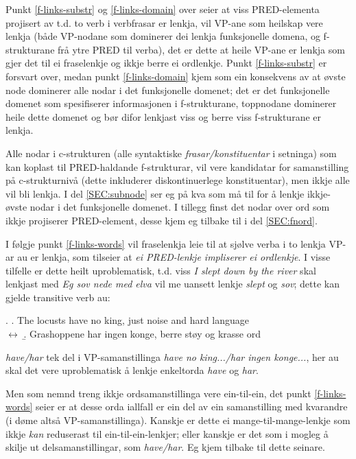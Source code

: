 \documentclass[11pt,a4paper,oneside,draft]{book}
\begin{document}
Punkt \ref{f-links-substr} og \ref{f-links-domain} over seier at viss
PRED-elementa projisert av t.d. to verb i verbfrasar er lenkja, vil
VP-ane som heilskap vere lenkja (både VP-nodane som dominerer dei
lenkja funksjonelle domena, og f-strukturane frå ytre PRED til verba),
det er dette at heile VP-ane er lenkja som gjer det til ei fraselenkje
og ikkje berre ei ordlenkje. Punkt \ref{f-links-substr} er forsvart
over, medan punkt \ref{f-links-domain} kjem som ein konsekvens av at
øvste node dominerer alle nodar i det funksjonelle domenet; det er det
funksjonelle domenet som spesifiserer informasjonen i f-strukturane,
toppnodane dominerer heile dette domenet og bør difor lenkjast viss og
berre viss f-strukturane er lenkja.  

Alle nodar i c-strukturen (alle syntaktiske \emph{frasar/konstituentar} i
setninga) som kan koplast til PRED-haldande f-strukturar, vil vere
kandidatar for samanstilling på c-strukturnivå (dette inkluderer
diskontinuerlege konstituentar), men ikkje alle vil bli lenkja.  I del
\ref{SEC:subnode} ser eg på kva som må til for å lenkje ikkje-øvste
nodar i det funksjonelle domenet.
I tillegg finst det nodar over ord som ikkje projiserer PRED-element,
desse kjem eg tilbake til i del \ref{SEC:fnord}.

I følgje punkt \ref{f-links-words} vil fraselenkja leie til at sjølve
verba i to lenkja VP-ar au er lenkja, som tilseier at \emph{ei PRED-lenkje impliserer ei ordlenkje}. I visse tilfelle er dette heilt
uproblematisk, t.d. viss \emph{I slept down by the river} skal lenkjast med
\emph{Eg sov nede med elva} vil me uansett lenkje \emph{slept} og \emph{sov}; dette
kan gjelde transitive verb au:

\ex. \a. The locusts have no king, just noise and hard language\\
     $\leftrightarrow$
     \b. Grashoppene har ingen konge, berre støy og krasse ord


\emph{have/har} tek del i VP-samanstillinga \emph{have no king.../har
ingen konge...}, her au skal det vere uproblematisk å lenkje
enkeltorda \emph{have} og \emph{har}.

Men som nemnd treng ikkje ordsamanstillinga vere ein-til-ein, det
punkt \ref{f-links-words} seier er at desse orda iallfall er ein del
av ein samanstilling med kvarandre (i døme \Last altså
VP-samanstillinga). Kanskje er dette ei mange-til-mange-lenkje som
ikkje \emph{kan} reduserast til ein-til-ein-lenkjer; eller kanskje er
det som i \Last mogleg å skilje ut delsamanstillingar, som
\emph{have/har}. Eg kjem tilbake til dette
 seinare.
\end{document}
